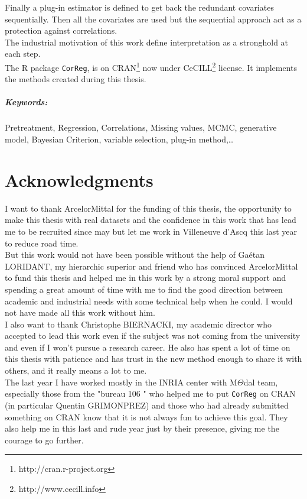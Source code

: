 \documentclass[12pt,a4paper]{report}
\begin{document}
	Finally a plug-in estimator is defined to get back the redundant covariates sequentially. Then all the covariates are used but the sequential approach act as a protection against correlations.
\\

	The industrial motivation of this work define interpretation as a stronghold at each step. 	
	\\
	The R package {\tt CorReg}, is on CRAN\footnote{http://cran.r-project.org} now under CeCILL\footnote{http://www.cecill.info} license. It implements the methods created during this thesis.
	
	 	
\paragraph{Keywords:} Pretreatment, Regression, Correlations, Missing values, MCMC, generative model, Bayesian Criterion, variable selection, plug-in method,\dots
	

\chapter*{Acknowledgments}
	I want to thank ArcelorMittal for the funding of this thesis, the opportunity to make this thesis with real datasets and the confidence in this work that has lead me to be recruited since may but let me work in Villeneuve d'Ascq this last year to reduce road time.\\
	
	But this work would not have been possible without the help of Gaétan LORIDANT, my hierarchic superior and friend who has convinced ArcelorMittal to fund this thesis and helped me in this work by a strong moral support and spending a great amount of time with me to find the good direction between academic and industrial needs with some technical help when he could. I would not have made all this work without him.\\
	
	I also want to thank Christophe BIERNACKI, my academic director who accepted to lead this work even if the subject was not coming from the university and even if I won't pursue a research career. He also has spent a lot of time on this thesis with patience and has trust in the new method enough to share it with others, and it really means a lot to me. \\
	
	The last year I have worked mostly in the INRIA center with M$\Theta$dal team, especially those from the "bureau 106 " who helped me to put {\tt CorReg} on CRAN (in particular Quentin GRIMONPREZ) and those who had already submitted something on CRAN know that it is not always fun to achieve this goal. They also help me in this last and rude year just by their presence, giving me the courage to go further. \\
	
\end{document}
